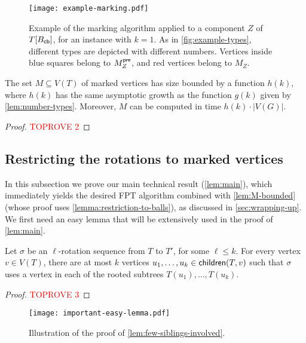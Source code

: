 \documentclass[a4paper,UKenglish,cleveref, autoref, thm-restate]{lipics-v2021}
\newcommand{\child}{{\sf children}\xspace}
\newcommand{\Bcb}{B_{\sf cb}\xspace}
\newcommand{\FPT}{{\sf FPT}\xspace}
\begin{document}
\begin{figure}[h!tb]
    \centering
    \vspace{-.25cm}
    \hspace{-.75cm}\texttt{[image: example-marking.pdf]}
    \caption{Example of the marking algorithm applied to a component $Z$ of $T[\Bcb]$, for an instance with $k=1$. As in \autoref{fig:example-types}, different types are depicted with different numbers. Vertices inside blue squares belong to $M_Z^{\sf pre}$, and red vertices belong to $M_Z$.\label{fig:example-marking}}
\end{figure}



\begin{lemma}\label{lem:M-bounded}
The set $M \subseteq V(T)$ of marked vertices has size bounded by a function $h(k)$,  where $h(k)$ has the same asymptotic growth as the function $g(k)$ given by \autoref{lem:number-types}. Moreover, $M$ can be computed in time $h(k) \cdot |V(G)|$.
\end{lemma}
\begin{proof}\textcolor{red}{TOPROVE 2}\end{proof}

\subsection{Restricting the rotations to marked vertices}
\label{sec:restriction-to-marked}

In this subsection we prove our main technical result (\autoref{lem:main}), which immediately yields the desired \FPT algorithm combined  with  \autoref{lem:M-bounded} (whose proof uses  \autoref{lemma:restriction-to-balls}), as discussed in \autoref{sec:wrapping-up}. We first need an easy lemma that will be extensively used in the proof of \autoref{lem:main}.

\begin{lemma}\label{lem:few-siblings-involved}
Let $\sigma$ be an $\ell$-rotation sequence from $T$ to $T'$, for some $\ell \leq k$. For every vertex $v \in V(T)$, there are at most  $k$ vertices  $u_1, \ldots, u_k \in \child(T,v)$ such that $\sigma$ uses a vertex in each of the rooted subtrees $T(u_1), \ldots, T(u_k)$.
\end{lemma}
\begin{proof}\textcolor{red}{TOPROVE 3}\end{proof}


\begin{figure}[h!tb]
    \centering
    \vspace{-.3cm}
    \texttt{[image: important-easy-lemma.pdf]}
    \caption{Illustration of the proof of \autoref{lem:few-siblings-involved}.\label{fig:important-easy-lemma}}
\end{figure}
\end{document}
